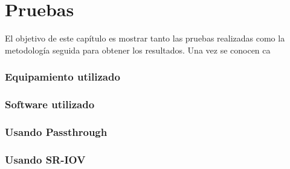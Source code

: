 \chapter{Pruebas\label{sec:desarrollo}}

El objetivo de este capítulo es mostrar tanto las pruebas realizadas como la metodología seguida para obtener los resultados. Una vez se conocen ca


\subsection{Equipamiento utilizado\label{sec:equipamiento}}

\subsection{Software utilizado\label{sec:sw}}



\subsection{Usando Passthrough\label{sec:pt}}

\subsection{Usando SR-IOV\label{sec:sriov}}